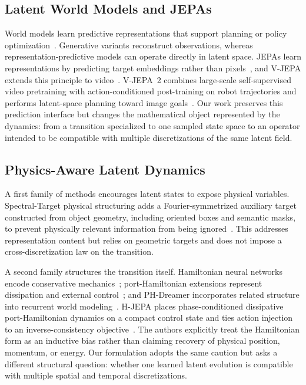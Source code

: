\documentclass{article}
\theoremstyle{plain}
\theoremstyle{definition}
\theoremstyle{remark}
\begin{document}
\subsection{Latent World Models and JEPAs}
World models learn predictive representations that support planning or policy optimization~\citep{ha2018worldmodels,hafner2019planet,hafner2020dreamer,hafner2023dreamerv3,hansen2024tdmpc2}. Generative variants reconstruct observations, whereas representation-predictive models can operate directly in latent space. JEPAs learn representations by predicting target embeddings rather than pixels~\citep{lecun2022path,assran2023ijepa}, and V-JEPA extends this principle to video~\citep{bardes2024vjepa}. V-JEPA~2 combines large-scale self-supervised video pretraining with action-conditioned post-training on robot trajectories and performs latent-space planning toward image goals~\citep{assran2025vjepa2}. Our work preserves this prediction interface but changes the mathematical object represented by the dynamics: from a transition specialized to one sampled state space to an operator intended to be compatible with multiple discretizations of the same latent field.

\subsection{Physics-Aware Latent Dynamics}
A first family of methods encourages latent states to expose physical variables. Spectral-Target physical structuring adds a Fourier-symmetrized auxiliary target constructed from object geometry, including oriented boxes and semantic masks, to prevent physically relevant information from being ignored~\citep{zhu2026spectral}. This addresses representation content but relies on geometric targets and does not impose a cross-discretization law on the transition.

A second family structures the transition itself. Hamiltonian neural networks encode conservative mechanics~\citep{greydanus2019hamiltonian}; port-Hamiltonian extensions represent dissipation and external control~\citep{desai2021port}; and PH-Dreamer incorporates related structure into recurrent world modeling~\citep{luan2026phdreamer}. H-JEPA places phase-conditioned dissipative port-Hamiltonian dynamics on a compact control state and ties action injection to an inverse-consistency objective~\citep{zoabi2026hjjepa}. The authors explicitly treat the Hamiltonian form as an inductive bias rather than claiming recovery of physical position, momentum, or energy. Our formulation adopts the same caution but asks a different structural question: whether one learned latent evolution is compatible with multiple spatial and temporal discretizations.
\end{document}
